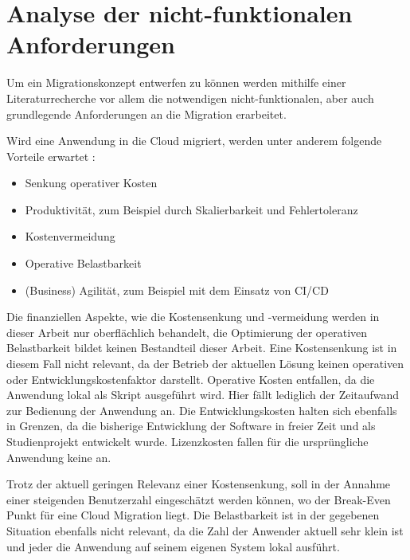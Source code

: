 \section{Analyse der nicht-funktionalen Anforderungen}
\label{sec:anforderungsanalyse}


Um ein Migrationskonzept entwerfen zu können %
werden mithilfe einer Literaturrecherche vor allem die notwendigen nicht-funktionalen, aber auch grundlegende Anforderungen an die Migration erarbeitet.

Wird eine Anwendung in die Cloud migriert, werden unter anderem folgende Vorteile erwartet \cite[Vgl. auch im Folgenden][03:23-05:36min]{AWS2019}:
\begin{itemize}
\item Senkung operativer Kosten
\item Produktivität, zum Beispiel durch Skalierbarkeit und Fehlertoleranz
\item Kostenvermeidung
\item Operative Belastbarkeit
\item (Business) Agilität, zum Beispiel mit dem Einsatz von CI/CD
\end{itemize}

Die finanziellen Aspekte, wie die Kostensenkung und -vermeidung werden in dieser Arbeit nur oberflächlich behandelt, die Optimierung der operativen Belastbarkeit bildet keinen Bestandteil dieser Arbeit. Eine Kostensenkung ist in diesem Fall nicht relevant, da der Betrieb der aktuellen Lösung keinen operativen oder Entwicklungskostenfaktor darstellt. Operative Kosten entfallen, da die Anwendung lokal als Skript ausgeführt wird. Hier fällt lediglich der Zeitaufwand zur Bedienung der Anwendung an. Die Entwicklungskosten halten sich ebenfalls in Grenzen, da die bisherige Entwicklung der Software in freier Zeit und als Studienprojekt entwickelt wurde. Lizenzkosten fallen für die ursprüngliche Anwendung keine an.

Trotz der aktuell geringen Relevanz einer Kostensenkung, soll in der Annahme einer steigenden Benutzerzahl eingeschätzt werden können, wo der Break-Even Punkt für eine Cloud Migration liegt. Die Belastbarkeit ist in der gegebenen Situation ebenfalls nicht relevant, da die Zahl der Anwender aktuell sehr klein ist und jeder die Anwendung auf seinem eigenen System lokal ausführt.

